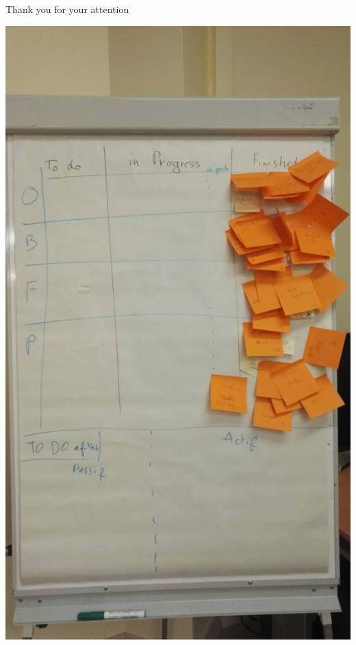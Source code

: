 \documentclass{beamer}
\newcounter{m} %
\newcounter{c} %
\begin{document}
\begin{frame}{Thank you for your attention}
\begin{minipage}[t]{.5\textwidth}
    \includegraphics[scale=0.15]{board.jpg}
  \end{minipage}

\end{frame}
\end{document}
